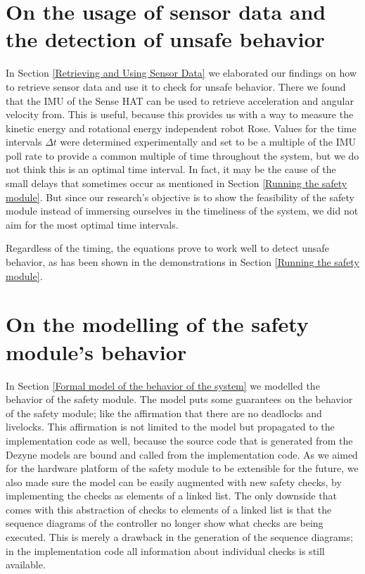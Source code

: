 \documentclass[12pt]{scrreprt}
\begin{document}
\section{On the usage of sensor data and the detection of unsafe behavior}
In Section \ref{Retrieving and Using Sensor Data} we elaborated our findings on how to retrieve sensor data and use it to check for unsafe behavior. There we found that the IMU of the Sense HAT can be used to retrieve acceleration and angular velocity from. This is useful, because this provides us with a way to measure the kinetic energy and rotational energy independent robot Rose. Values for the time intervals $\Delta t$ were determined experimentally and set to be a multiple of the IMU poll rate to provide a common multiple of time throughout the system, but we do not think this is an optimal time interval. In fact, it may be the cause of the small delays that sometimes occur as mentioned in Section \ref{Running the safety module}. But since our research's objective is to show the feasibility of the safety module instead of immersing ourselves in the timeliness of the system, we did not aim for the most optimal time intervals.
\par
Regardless of the timing, the equations prove to work well to detect unsafe behavior, as has been shown in the demonstrations in Section \ref{Running the safety module}. 


\section{On the modelling of the safety module's behavior}
\label{On modelling safety module behavior}
In Section \ref{Formal model of the behavior of the system} we modelled the behavior of the safety module. The model puts some guarantees on the behavior of the safety module; like the affirmation that there are no deadlocks and livelocks. This affirmation is not limited to the model but propagated to the implementation code as well, because the source code that is generated from the Dezyne models are bound and called from the implementation code. As we aimed for the hardware platform of the safety module to be extensible for the future, we also made sure the model can be easily augmented with new safety checks, by implementing the checks as elements of a linked list. The only downside that comes with this abstraction of checks to elements of a linked list is that the sequence diagrams of the controller no longer show what checks are being executed. This is merely a drawback in the generation of the sequence diagrams; in the implementation code all information about individual checks is still available.
\end{document}
